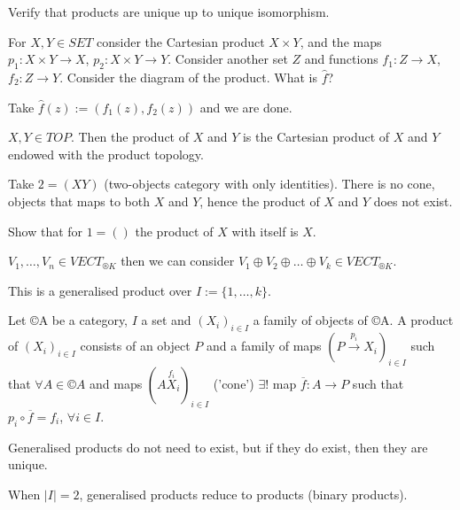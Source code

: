 \documentclass[12pt]{article}					%
\begin{document}
\begin{priklad}
	Verify that products are unique up to unique isomorphism.
\end{priklad}

\begin{priklad}
	For $X, Y \in SET$ consider the Cartesian product $X \times Y$, and the maps $p_1: X \times Y \rightarrow X$, $p_2: X \times Y \rightarrow Y$. Consider another set $Z$ and functions $f_1: Z \rightarrow X$, $f_2: Z \rightarrow Y$. Consider the diagram of the product. What is $\hat{f}$?

	\begin{reseni}
		Take $\hat{f}(z) := (f_1(z), f_2(z))$ and we are done.
	\end{reseni}
\end{priklad}

\begin{priklady}
	$X, Y \in TOP$. Then the product of $X$ and $Y$ is the Cartesian product of $X$ and $Y$ endowed with the product topology.

	Take $2 = (X Y)$ (two-objects category with only identities). There is no cone, objects that maps to both $X$ and $Y$, hence the product of $X$ and $Y$ does not exist.
\end{priklady}

\begin{priklad}
	Show that for $1 = ()$ the product of $X$ with itself is $X$.
\end{priklad}

\begin{priklad}
	$V_1, …, V_n \in VECT_{®K}$ then we can consider $V_1 \oplus V_2 \oplus … \oplus V_k \in VECT_{®K}$.

	\begin{poznamkain}
		This is a generalised product over $I := \{1, …, k\}$.
	\end{poznamkain}
\end{priklad}

\begin{definice}
	Let ©A be a category, $I$ a set and $(X_i)_{i \in I}$ a family of objects of ©A. A product of $(X_i)_{i \in I}$ consists of an object $P$ and a family of maps $(P \overset{p_i}\rightarrow X_i)_{i \in I}$ such that $\forall A \in ©A$ and maps $(A \overset{f_i} X_i)_{i \in I}$ ('cone') $\exists!$ map $\overline{f}: A \rightarrow P$ such that $p_i \circ \overline{f} = f_i$, $\forall i \in I$.

	\begin{poznamkain}
		Generalised products do not need to exist, but if they do exist, then they are unique.
	\end{poznamkain}

	\begin{dusledekin}
		When $|I| = 2$, generalised products reduce to products (binary products).
	\end{dusledekin}
\end{definice}
\end{document}
